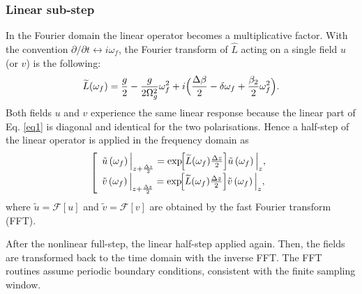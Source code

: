 \documentclass{article}
\begin{document}
    \subsubsection{Linear sub‑step}
    In the Fourier domain the linear operator becomes a multiplicative factor. With the convention $\partial/\partial t \leftrightarrow i\omega_{f}$,
    the Fourier transform of $\hat L$ acting on a single field $u$ (or $v$) is the following:
    \begin{equation}
        \widetilde L(\omega_{f})
        = \frac{g}{2} - \frac{g}{2\Omega_g^2}\omega_{f}^2
        + i\Bigl(\frac{\Delta\beta}{2} - \delta\omega_{f} + \frac{\beta_2}{2}\omega_{f}^2\Bigr).
    \end{equation}
    Both fields $u$ and $v$ experience the same linear response because the linear part
    of Eq. \ref{eq1} is diagonal and identical for the two polarisations.
    Hence a half‑step of the linear operator is applied in the frequency domain as
    \begin{equation}
        \left[
        \begin{array}{ll}
            \tilde u\left(\omega_f\right) \Big| _{z+\frac{\Delta z}{2}} =
            \exp\!\Bigl[\widetilde L(\omega_f)\frac{\Delta z}{2}\Bigr] \tilde u\left(\omega_f\right) \Big| _{z},\\
            \tilde v\left(\omega_f\right) \Big| _{z+\frac{\Delta z}{2}} =
            \exp\!\Bigl[\widetilde L(\omega_f)\frac{\Delta z}{2}\Bigr] \tilde v\left(\omega_f\right) \Big| _{z},
        \end{array}
        \right.
    \end{equation}
    where $\tilde u = \mathcal{F}[u]$ and $\tilde v = \mathcal{F}[v]$ are obtained by the fast Fourier transform (FFT).
    
    After the nonlinear full-step, the linear half-step applied again. Then, the fields are transformed back to the time domain with the inverse FFT.
    The FFT routines assume periodic boundary conditions, consistent with the finite sampling window.
    
\end{document}
